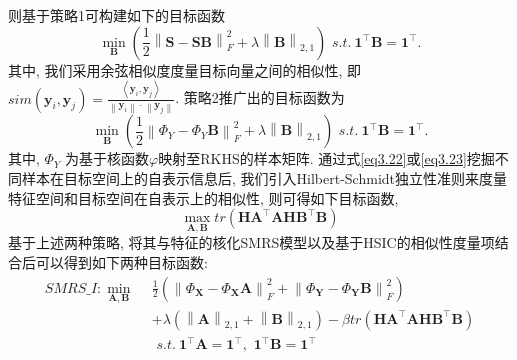 \documentclass[lang=cn,10pt]{gorgeousnbook}
\numberwithin{equation}{section}%
\numberwithin{figure}{section}%
\begin{document}
则基于策略1可构建如下的目标函数
\begin{equation}
    \min_{\boldsymbol{B}} \left( \frac{1}{2}\left\| \boldsymbol{S}-\boldsymbol{SB} \right\| _{F}^{2}+\lambda \left\| \boldsymbol{B} \right\| _{2,1} \right) \,\,s.t. \  \mathbf{1}^{\top}\boldsymbol{B}=\boldsymbol{1}^{\top}.\label{eq3.22}
\end{equation}
其中, 我们采用余弦相似度度量目标向量之间的相似性, 即$sim\left( \boldsymbol{y}_i,\boldsymbol{y}_j \right) =\frac{\left< \boldsymbol{y}_i,\boldsymbol{y}_j \right>}{\left\| \boldsymbol{y}_i \right\| \cdot \left\| \boldsymbol{y}_j \right\|}$.
策略2推广出的目标函数为
\begin{equation}
    \min_{\boldsymbol{B}} \left( \frac{1}{2}\left\| \boldsymbol{\varPhi }_Y-\boldsymbol{\varPhi }_Y\boldsymbol{B} \right\| _{F}^{2}+\lambda \left\| \boldsymbol{B} \right\| _{2,1} \right) \,\,s.t. \  \mathbf{1}^{\top}\boldsymbol{B}=\mathbf{1}^{\top}.\label{eq3.23}
\end{equation}
其中, $\boldsymbol{\varPhi }_Y$ 为基于核函数$\varphi$映射至RKHS的样本矩阵. 通过式\eqref{eq3.22}或\eqref{eq3.23}挖掘不同样本在目标空间上的自表示信息后, 我们引入Hilbert-Schmidt独立性准则来度量特征空间和目标空间在自表示上的相似性, 则可得如下目标函数,
\begin{equation}
    \max_{\boldsymbol{A},\boldsymbol{B}} tr\left( \boldsymbol{HA}^{\top}\boldsymbol{AHB}^{\top}\boldsymbol{B} \right)
\end{equation}
基于上述两种策略, 将其与特征的核化SMRS模型以及基于HSIC的相似性度量项结合后可以得到如下两种目标函数:
\begin{equation}
    \begin{aligned}
        SMRS\_I: \min_{\boldsymbol{A},\boldsymbol{B}}\ \ &\frac{1}{2}\left( \left\| \varPhi _{\boldsymbol{X}}-\varPhi _{\boldsymbol{X}}\boldsymbol{A} \right\| _{F}^{2}+\left\| \varPhi _{\boldsymbol{Y}}-\varPhi _{\boldsymbol{Y}}\boldsymbol{B} \right\| _{F}^{2} \right) \\
        & +\lambda \left( \left\| \boldsymbol{A} \right\| _{2,1}+\left\| \boldsymbol{B} \right\| _{2,1} \right)-\beta tr\left( \boldsymbol{HA}^{\top}\boldsymbol{AHB}^{\top}\boldsymbol{B} \right)\\
        &\,\,s.t.\ \mathbf{1}^{\top}\boldsymbol{A}=\mathbf{1}^{\top},\,\,\mathbf{1}^{\top}\boldsymbol{B}=\mathbf{1}^{\top}
        \end{aligned}
\end{equation}
\end{document}
